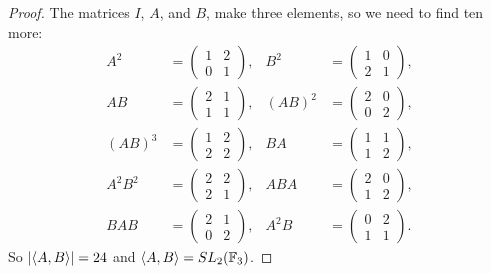 \begin{proof}
  The matrices $I$, $A$, and $B$, make three elements, so we need to
  find ten more:
  \begin{align*}
    A^2 &= \begin{pmatrix} 1 & 2 \\ 0 & 1 \end{pmatrix}, &
    B^2 &= \begin{pmatrix} 1 & 0 \\ 2 & 1 \end{pmatrix}, \\
    AB &= \begin{pmatrix} 2 & 1 \\ 1 & 1 \end{pmatrix}, &
    (AB)^2 &= \begin{pmatrix} 2 & 0 \\ 0 & 2 \end{pmatrix}, \\
    (AB)^3 &= \begin{pmatrix} 1 & 2 \\ 2 & 2 \end{pmatrix}, &
    BA &= \begin{pmatrix} 1 & 1 \\ 1 & 2 \end{pmatrix}, \\
    A^2B^2 &= \begin{pmatrix} 2 & 2 \\ 2 & 1 \end{pmatrix}, &
    ABA &= \begin{pmatrix} 2 & 0 \\ 1 & 2 \end{pmatrix}, \\
    BAB &= \begin{pmatrix} 2 & 1 \\ 0 & 2 \end{pmatrix}, &
    A^2B &= \begin{pmatrix} 0 & 2 \\ 1 & 1 \end{pmatrix}.
  \end{align*}
  So $\lvert{\langle{A,B}\rangle}\rvert = 24$ and $\langle{A,B}\rangle = SL_2(\mathbb{F}_3)$.
\end{proof}

